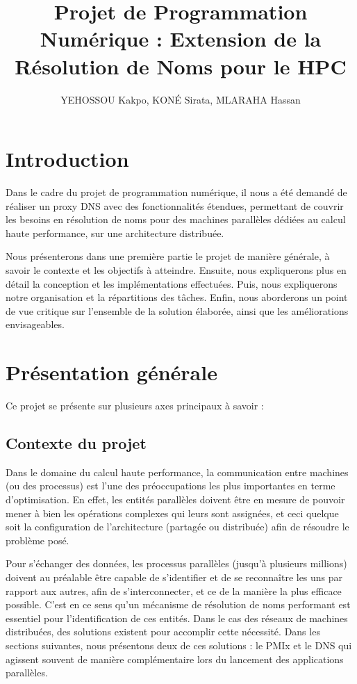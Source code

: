 \documentclass[12pt,a4paper]{article}
\title{Projet de Programmation Numérique : Extension de la Résolution de Noms pour le HPC\\}
\author{YEHOSSOU Kakpo, KONÉ Sirata, MLARAHA Hassan}
\begin{document}
\maketitle

\newpage
\tableofcontents
\listoffigures
\newpage

\newpage
\section*{Introduction}

\quad Dans le cadre du projet de programmation numérique, il nous a été demandé de réaliser un proxy DNS avec des fonctionnalités étendues, permettant de couvrir les besoins en résolution de noms pour des machines parallèles dédiées au calcul haute performance, sur une architecture distribuée.

\quad Nous présenterons dans une première partie le projet de manière générale, à savoir le contexte et les objectifs à atteindre. Ensuite, nous expliquerons plus en détail la conception et les implémentations effectuées. Puis, nous expliquerons notre organisation et la répartitions des tâches. Enfin, nous aborderons un point de vue critique sur l’ensemble de la solution élaborée, ainsi que les améliorations envisageables.

\newpage
\section{Présentation générale}
Ce projet se présente sur plusieurs axes principaux à savoir :
\subsection{Contexte du projet}

\quad Dans le domaine du calcul haute performance, la communication entre machines (ou des processus) est l’une des préoccupations les plus importantes en terme d’optimisation. En effet, les entités parallèles doivent être en mesure de pouvoir mener à bien les opérations complexes qui leurs sont assignées, et ceci quelque soit la configuration de l’architecture (partagée ou distribuée) afin de résoudre le problème posé.

\quad Pour s’échanger des données, les processus parallèles (jusqu'à plusieurs millions) doivent au préalable être capable de s’identifier et de se reconnaître les uns par rapport aux autres, afin de s'interconnecter, et ce de la manière la plus efficace possible. C’est en ce sens qu’un mécanisme de résolution de noms performant est essentiel pour l’identification de ces entités. Dans le cas des réseaux de machines distribuées, des solutions existent pour accomplir cette nécessité. Dans les sections suivantes, nous présentons deux de ces solutions : le PMIx et le DNS qui agissent souvent de manière complémentaire lors du lancement des applications parallèles.
\end{document}
